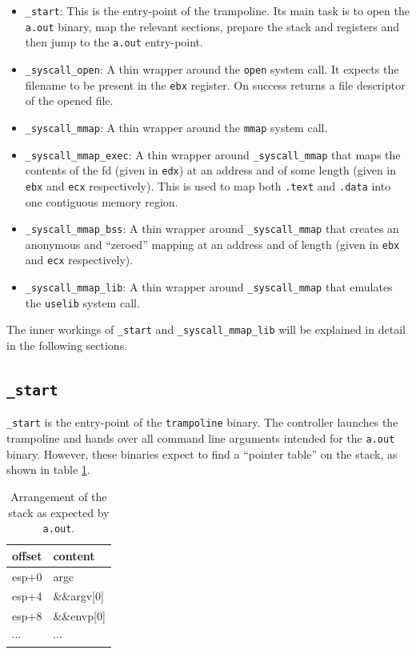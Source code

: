 \documentclass[draft,final]{vutinfth} %
\begin{document}
\begin{itemize}
    \item \texttt{\_start}: This is the entry-point of the trampoline. Its main task is to open the \texttt{a.out} binary, map the relevant sections, prepare the stack and registers and then jump to the \texttt{a.out} entry-point.
    \item \texttt{\_syscall\_open}: A thin wrapper around the \texttt{open} system call. It expects the filename to be present in the \texttt{ebx} register. On success returns a file descriptor of the opened file.
    \item \texttt{\_syscall\_mmap}: A thin wrapper around the \texttt{mmap} system call.
    \item \texttt{\_syscall\_mmap\_exec}: A thin wrapper around \texttt{\_syscall\_mmap} that maps the contents of the fd (given in \texttt{edx}) at an address and of some length (given in \texttt{ebx} and \texttt{ecx} respectively). This is used to map both \texttt{.text} and \texttt{.data} into one contiguous memory region.
    \item \texttt{\_syscall\_mmap\_bss}: A thin wrapper around \texttt{\_syscall\_mmap} that creates an anonymous and ``zeroed'' mapping at an address and of length (given in \texttt{ebx} and \texttt{ecx} respectively).
    \item \texttt{\_syscall\_mmap\_lib}: A thin wrapper around \texttt{\_syscall\_mmap} that emulates the \texttt{uselib} system call.
\end{itemize}

The inner workings of \texttt{\_start} and \texttt{\_syscall\_mmap\_lib} will be explained in detail in the following sections.

\subsection{\texttt{\_start}}

\texttt{\_start} is the entry-point of the \texttt{trampoline} binary. The controller launches the trampoline and hands over all command line arguments intended for the \texttt{a.out} binary. However, these binaries expect to find a ``pointer table'' on the stack\cite[lines 54-59]{BinfmtAoutC}, as shown in table \ref{tab:expected_stack}.

\begin{table}[H]
    \centering
    \begin{tabular}{|l|l|}\hline
    offset & content       \\ \hline\hline
    esp+0  & argc          \\ \hline
    esp+4  & \&\&argv{[}0{]} \\ \hline
    esp+8  & \&\&envp{[}0{]} \\ \hline
    $\cdots$ & $\cdots$ \\ \hline
    \end{tabular}
    \caption{Arrangement of the stack as expected by \texttt{a.out}.}
    \label{tab:expected_stack}
\end{table}
\end{document}
